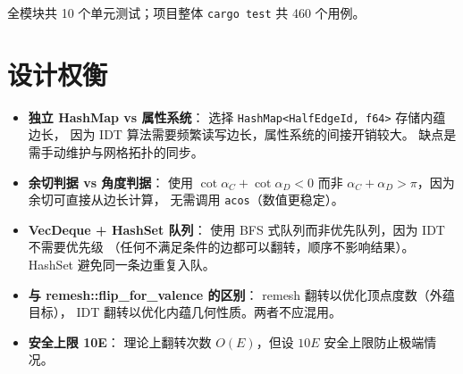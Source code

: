 \documentclass[11pt,a4paper]{article}
\begin{document}
全模块共 10 个单元测试；项目整体 \texttt{cargo test} 共 460 个用例。

\section{设计权衡}

\begin{itemize}
  \item \textbf{独立 HashMap vs 属性系统}：
        选择 \texttt{HashMap<HalfEdgeId, f64>} 存储内蕴边长，
        因为 IDT 算法需要频繁读写边长，属性系统的间接开销较大。
        缺点是需手动维护与网格拓扑的同步。

  \item \textbf{余切判据 vs 角度判据}：
        使用 $\cot\alpha_C + \cot\alpha_D < 0$ 而非
        $\alpha_C + \alpha_D > \pi$，因为余切可直接从边长计算，
        无需调用 \texttt{acos}（数值更稳定）。

  \item \textbf{VecDeque + HashSet 队列}：
        使用 BFS 式队列而非优先队列，因为 IDT 不需要优先级
        （任何不满足条件的边都可以翻转，顺序不影响结果）。
        HashSet 避免同一条边重复入队。

  \item \textbf{与 remesh::flip\_for\_valence 的区别}：
        remesh 翻转以优化顶点度数（外蕴目标），
        IDT 翻转以优化内蕴几何性质。两者不应混用。

  \item \textbf{安全上限 10E}：
        理论上翻转次数 $O(E)$，但设 $10E$ 安全上限防止极端情况。
\end{itemize}
\end{document}
